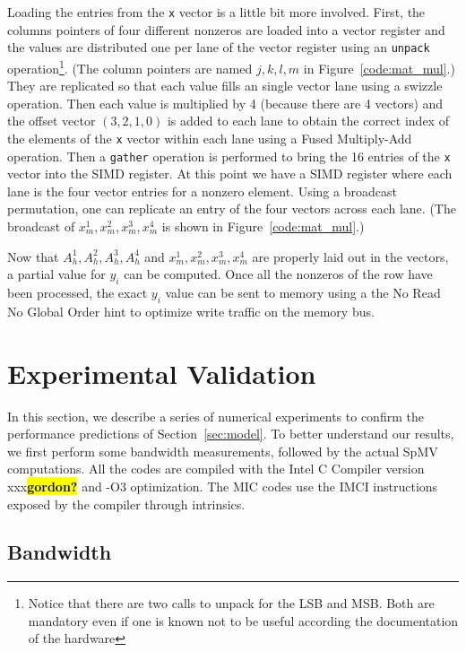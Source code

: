 \documentclass[10pt,conference,compsocconf]{IEEEtran}
\newcommand{\todo}[1]{{\color{red}\textbf{\hl{#1}}\xspace}}
\begin{document}
Loading the entries from the {\tt x} vector is a little bit more
involved. First, the columns pointers of four different nonzeros are
loaded into a vector register and the values are distributed one per
lane of the vector register using an {\tt unpack}
operation\footnote{Notice that there are two calls to unpack for the
  LSB and MSB. Both are mandatory even if one is known not to be
  useful according the documentation of the hardware}. (The column
pointers are named $j,k,l,m$ in Figure~\ref{code:mat_mul}.) They
are replicated so that each value fills an single vector lane 
using a swizzle operation. Then each value is multiplied by 4 
(because there are 4 vectors) 
and the offset vector $(3,2,1,0)$ is added to each lane to obtain the
correct index of the elements of the {\tt x} vector within each lane
using a Fused Multiply-Add operation. Then a {\tt gather} operation is
performed to bring the 16 entries of the {\tt x} vector into the SIMD
register. At this point we have a SIMD register where each lane is the
four vector entries for a nonzero element. Using a broadcast
permutation, one can replicate an entry of the four vectors across
each lane. (The broadcast of $x_m^1,x_m^2,x_m^3,x_m^4$ is shown in
Figure~\ref{code:mat_mul}.)

Now that $A_h^1,A_h^2,A_h^3,A_h^4$ and $x_m^1,x_m^2,x_m^3,x_m^4$ are
properly laid out in the vectors, a partial value for $y_i$ can be
computed. Once all the nonzeros of the row have been processed, the
exact $y_i$ value can be sent to memory using a the No Read No Global
Order hint to optimize write traffic on the memory bus.


\section{Experimental Validation}
\label{sec:expe}
In this section, we describe a series of numerical experiments to
confirm the performance predictions of Section~\ref{sec:model}. To
better understand our results, we first perform some bandwidth
measurements, followed by the actual SpMV computations. All the codes
are compiled with the Intel C Compiler version xxx\todo{gordon?} and
-O3 optimization. The MIC codes use the IMCI instructions exposed by
the compiler through intrinsics.

\subsection{Bandwidth}
\end{document}
